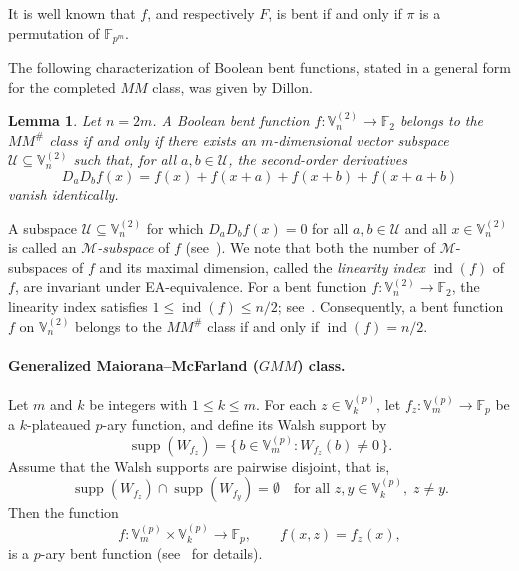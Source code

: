 \documentclass[12pt]{article}
\theoremstyle{plain}
\newtheorem{lemma}{Lemma}
\theoremstyle{definition}
\newcommand{\V}{\mathbb{V}}
\renewcommand{\to}{\rightarrow}
\begin{document}
	It is well known that \(f\), and respectively \(F\), is bent if and only if
	\(\pi\) is a permutation of $\mathbb{F}_{p^m}$.
	
	The following characterization of Boolean bent functions, stated in a general form for the completed \(MM\) class, was given by Dillon.
	
	\begin{lemma}{\cite[Dillon's criterion]{dillon}}\label{lem:second-order}
		Let \(n = 2m\). A Boolean bent function $f : \V_n^{(2)} \to \mathbb{F}_2$
		belongs to the \(MM^{\#}\) class if and only if there exists an \(m\)-dimensional vector subspace
		\(\mathcal U \subseteq \V_n^{(2)}\) such that, for all \(a,b \in \mathcal U \), the second-order derivatives
		\begin{equation}\label{eq:second-order-derivative}
			D_a D_b f(x)
			= f(x) + f(x+a) + f(x+b) + f(x+a+b)
		\end{equation}
		vanish identically.
	\end{lemma}
	A subspace \(\mathcal{U} \subseteq \V_n^{(2)}\) for which
	\(D_a D_b f(x) = 0\) for all \(a,b \in \mathcal{U}\) and all
	\(x \in \V_n^{(2)}\) is called an \emph{\(\mathcal{M}\)-subspace} of \(f\)
	(see~\cite{pp}). We note that both the number of \(\mathcal{M}\)-subspaces of
	\(f\) and its maximal dimension, called the \emph{linearity index}
	\(\operatorname{ind}(f)\) of \(f\), are invariant under EA-equivalence.
	For a bent function \(f \colon \V_n^{(2)} \to \mathbb{F}_2\), the linearity
	index satisfies \(1 \le \operatorname{ind}(f) \le n/2\);
	see~\cite[Proposition~5.1]{Pasalic26}. Consequently, a bent function \(f\) on
	\(\V_n^{(2)}\) belongs to the \(MM^{\#}\) class if and only if
	\(\operatorname{ind}(f) = n/2\).
	
	\paragraph{Generalized Maiorana--McFarland (\(GMM\)) class.}
	Let \(m\) and \(k\) be integers with \(1 \le k \le m\).
	For each \(z \in \V_k^{(p)}\), let $f_z : \V_m^{(p)} \to \mathbb{F}_p$
	be a \(k\)-plateaued \(p\)-ary function, and define its Walsh support by
	\[
	\operatorname{supp}(W_{f_z})
	= \{\, b \in \V_m^{(p)} : W_{f_z}(b) \neq 0 \,\}.
	\]
	Assume that the Walsh supports are pairwise disjoint, that is,
	\[
	\operatorname{supp}(W_{f_z}) \cap
	\operatorname{supp}(W_{f_y}) = \emptyset
	\quad
	\text{for all } z,y \in \V_k^{(p)},\; z \neq y.
	\]
	Then the function
	\begin{equation}\label{eq:GMM}
		f : \V_m^{(p)} \times \V_k^{(p)} \to \mathbb{F}_p,
		\qquad
		f(x,z) = f_z(x),
	\end{equation}
	is a \(p\)-ary bent function (see~\cite{cmpGMM} for details).
	
\end{document}
